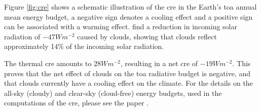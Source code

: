 

Figure \ref{fig:cre} shows a schematic illustration of the \acrshort{cre} in the Earth's \acrshort{toa} annual mean energy budget, a negative sign denotes a cooling effect and a positive sign can be associated with a warming effect. %
 find a reduction in incoming solar radiation of $-47Wm^{-2}$ caused by clouds, showing that clouds reflect approximately 14\% of the incoming solar radiation. 

The thermal \acrshort{cre} amounts to $28Wm^{-2}$, resulting in a net \acrshort{cre} of $-19Wm^{-2}$. 
This proves that the net effect of clouds on the \acrshort{toa} radiative budget is negative, and that clouds currently have a cooling effect on the climate. For the details on the all-sky (cloudy) and clear-sky (cloud-free) energy budgets, used in the computations of the \acrshort{cre}, please see the paper . 



